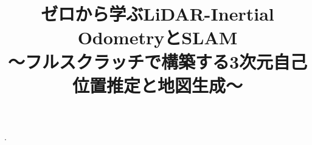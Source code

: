 \documentclass[]{interact}
\theoremstyle{plain}%
\theoremstyle{definition}
\theoremstyle{remark}
\begin{document}

\title{ゼロから学ぶLiDAR-Inertial OdometryとSLAM\\〜フルスクラッチで構築する3次元自己位置推定と地図生成〜}

\author{
}

\maketitle










\cite{BorensteinJRS1997}.






























\end{document}
